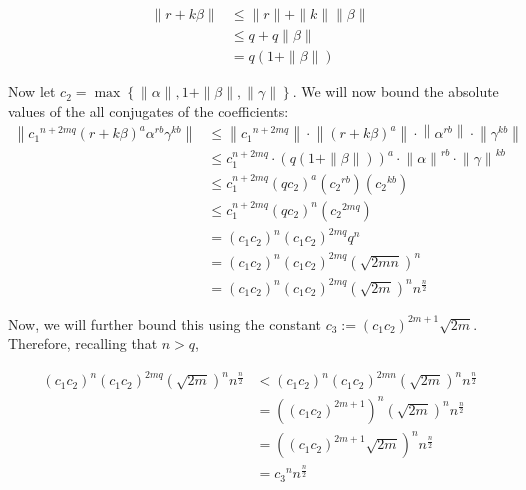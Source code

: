 \documentclass[a4paper, 11pt]{book}
\begin{document}
{\begin{align*}
    \| r + k\beta \| &\leq \| r \| + \| k \| \| \beta \| \\
                     &\leq q + q \| \beta \| \\
                     &= q\left(1 + \| \beta \|\right)
\end{align*}

Now let $c_2 = \max\left\{\| \alpha \|, 1 + \|\beta\|, \| \gamma \|\right\}$. We will now bound the absolute values of the all conjugates of the coefficients: 
\begin{align*}
    \left\|{c_1}^{n+2mq}{(r+k\beta)}^{a}{\alpha}^{rb}\gamma^{kb}\right\| &\leq \left\| {c_1}^{n+2mq} \right\| \cdot \left\| {(r + k\beta)}^{a} \right\| \cdot \left\| {\alpha}^{rb} \right\| \cdot \left\| {\gamma}^{kb} \right\| \\
                                                              &\leq c_1^{n+2mq} \cdot {\left(q\left(1 + \| \beta \|\right)\right)}^{a} \cdot {\| \alpha \|}^{rb} \cdot {\| \gamma \|}^{kb} \\
                                                              &\leq c_1^{n+2mq} {\left({qc_2}\right)}^{a} \left({c_2}^{rb}\right) \left({c_2}^{kb}\right) \\
                                                              &\leq c_1^{n+2mq} {\left({qc_2}\right)}^{n} \left({c_2}^{2mq}\right) \\
                                                              &= {\left(c_{1}c_{2}\right)}^{n} {\left(c_{1}c_{2}\right)}^{2mq}q^{n} \\
                                                              &=  {\left(c_{1}c_{2}\right)}^{n} {\left(c_{1}c_{2}\right)}^{2mq}{\left(\sqrt{2mn}\right)}^{n} \\
                                                              &= {\left(c_{1}c_{2}\right)}^{n} {\left(c_{1}c_{2}\right)}^{2mq}{\left(\sqrt{2m}\right)}^{n}n^{\frac{n}{2}}
\end{align*}

Now, we will further bound this using the constant $c_3 := {\left(c_{1}c_{2}\right)}^{2m+1}\sqrt{2m}$. Therefore, recalling that $n > q$, 

\begin{align*}
    {\left(c_{1}c_{2}\right)}^{n} {\left(c_{1}c_{2}\right)}^{2mq}{\left(\sqrt{2m}\right)}^{n}n^{\frac{n}{2}} &< {(c_{1}c_{2})}^{n}{(c_{1}c_{2})}^{2mn}{\left(\sqrt{2m}\right)}^{n}n^{\frac{n}{2}} \\
                                                                                                             &= {\left({(c_{1}c_{2})}^{2m+1}\right)}^{n}{\left(\sqrt{2m}\right)}^{n}n^{\frac{n}{2}} \\
                                                                                                             &= {\left({(c_{1}c_{2})}^{2m+1}\sqrt{2m}\right)}^{n}{n}^{\frac{n}{2}} \\
                                                                                                             &= {c_3}^{n}n^{\frac{n}{2}}
\end{align*}

}
\end{document}
